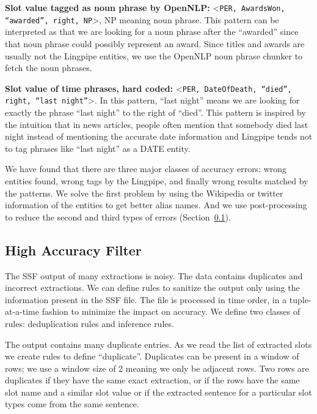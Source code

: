 \textbf{Slot value tagged as noun phrase by OpenNLP:} \textless \texttt{PER, AwardsWon, ``awarded'', 
right, NP}\textgreater, NP meaning noun phrase. This pattern can be interpreted 
as that we are looking for a noun phrase after the ``awarded'' since that noun 
phrase could possibly represent an award. Since titles and awards are usually 
not the Lingpipe entities, we use the OpenNLP noun phrase chunker to fetch the 
noun phrases.

\textbf{Slot value of time phrases, hard coded:} \textless \texttt{PER, DateOfDeath, ``died'', right, 
``last night''}\textgreater. In this pattern, ``last night'' means we are looking for 
exactly the phrase ``last night'' to the right of ``died''. This pattern is 
inspired by the intuition that in news articles, people often mention that 
somebody died last night instead of mentioning the accurate date information 
and Lingpipe tends not to tag phrases like ``last night'' as a DATE entity. 

We have found that there are three major classes of accuracy errors:
wrong entities found, wrong tags by the Lingpipe, and finally wrong results matched 
by the patterns. We solve the first problem by using the Wikipedia or twitter 
information of the entities to get better alias names. And we use
post-processing to reduce the second and third types of errors (Section~\ref{section:highAccuracyFilter}).

\subsection{High Accuracy Filter}
\label{section:highAccuracyFilter}

The SSF output of many extractions is noisy. The data contains duplicates and 
incorrect extractions. We can define rules to sanitize the output only using 
the information present in the SSF file. The file is processed in time order, 
in a tuple-at-a-time fashion to minimize the impact on accuracy. We define 
two classes of rules: deduplication rules and inference rules.

The output contains many duplicate entries. As we read the list of extracted 
slots we create rules to define ``duplicate''. Duplicates can be present in a 
window of rows; we use a window size of 2 meaning we only be adjacent rows. 
Two rows are duplicates if they have the same exact extraction, or if the 
rows have the same slot name and a similar slot value or if the extracted 
sentence for a particular slot types come from the same sentence.

